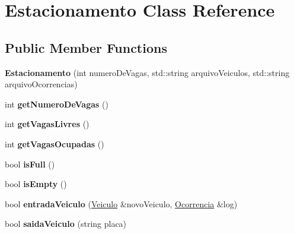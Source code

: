 \hypertarget{classEstacionamento}{}\section{Estacionamento Class Reference}
\label{classEstacionamento}
\subsection*{Public Member Functions}
\begin{DoxyCompactItemize}
\item 
\mbox{\label{classEstacionamento_a0e6df919d6c9624a8e1eed57b0b0d440}} 
{\bfseries Estacionamento} (int numero\+De\+Vagas, std\+::string arquivo\+Veiculos, std\+::string arquivo\+Ocorrencias)
\item 
\mbox{\label{classEstacionamento_a311e80dca4a7069b9b8661ab846674ba}} 
int {\bfseries get\+Numero\+De\+Vagas} ()
\item 
\mbox{\label{classEstacionamento_a8ff2eee76869b801bc2ee16a4e44e951}} 
int {\bfseries get\+Vagas\+Livres} ()
\item 
\mbox{\label{classEstacionamento_ac41b40a4e850904192516afea6f8f001}} 
int {\bfseries get\+Vagas\+Ocupadas} ()
\item 
\mbox{\label{classEstacionamento_afae8eeb1b8a4c2b411744d11dec2a514}} 
bool {\bfseries is\+Full} ()
\item 
\mbox{\label{classEstacionamento_af22e81269080c1463d80cf81f60adf15}} 
bool {\bfseries is\+Empty} ()
\item 
\mbox{\label{classEstacionamento_aab8cf1c8d6869ca1a7a59d6973436b7f}} 
bool {\bfseries entrada\+Veiculo} (\hyperlink{classVeiculo}{Veiculo} \&novo\+Veiculo, \hyperlink{classOcorrencia}{Ocorrencia} \&log)
\item 
\mbox{\label{classEstacionamento_abfd5beaa59fda240bed7df3a0d582945}} 
bool {\bfseries saida\+Veiculo} (string placa)
\item 
\mbox{\label{classEstacionamento_a57d8257bf3de90f0bc670574f25920e5}} 

\end{DoxyCompactItemize}
